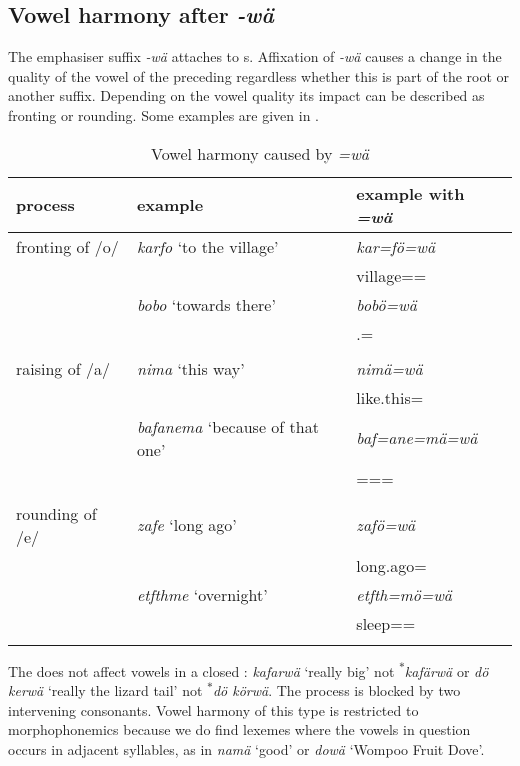 \subsection{Vowel harmony after \emph{-wä}} \label{vowharmwae}

The emphasiser suffix \emph{-wä} attaches to s. Affixation of \emph{-wä} causes a change in the quality of the vowel of the preceding  regardless whether this  is part of the root or another suffix. Depending on the vowel quality its impact can be described as fronting or rounding. Some examples are given in .

\begin{table}
\caption{Vowel harmony caused by \emph{=wä}}
\label{vowelharmwae}
	\begin{tabularx}{\textwidth}{Xll}
		\lsptoprule
		 {process}&{example}& {example with} \emph{=wä} \\ \midrule
		fronting of /o/&\emph{karfo} `to the village' & \emph{kar=fö=wä} \\
		&&village=\Abl{}=\Emph{}\\
		&\emph{bobo} `towards there' & \emph{bobö=wä}\\
		&&\Med{}.\All{}=\Emph{}\\
		&&\\
		raising of /a/&\emph{nima} `this way' & \emph{nimä=wä}\\
		&&like.this=\Emph{}\\
		&\emph{bafanema} `because of that one' & \emph{baf=ane=mä=wä}\\
		&&\Recog=\Poss=\Char=\Emph{}\\
		&&\\
		rounding of /e/&\emph{zafe} `long ago' & \emph{zafö=wä}\\
		&&long.ago=\Emph\\
		&\emph{etfthme} `overnight' & \emph{etfth=mö=wä}\\
		&&sleep=\Ins=\Emph\\
		\lspbottomrule
	\end{tabularx}
\end{table}	%

The  does not affect vowels in a closed : \emph{kafarwä} `really big' not \textsuperscript{$\ast$}\emph{kafärwä} or \emph{dö kerwä} `really the lizard tail' not \textsuperscript{$\ast$}\emph{dö körwä}. The process is blocked by two intervening consonants. Vowel harmony of this type is restricted to morphophonemics because we do find lexemes where the vowels in question occurs in adjacent syllables, as in \emph{namä} `good' or \emph{dowä} `Wompoo Fruit Dove'.

